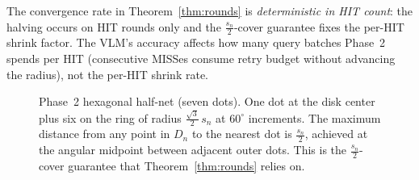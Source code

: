 \documentclass[sigconf,nonacm]{acmart}
\begin{document}
\medskip
\noindent
The convergence rate in Theorem~\ref{thm:rounds} is \emph{deterministic
in HIT count}: the halving occurs on HIT rounds only and the
$\frac{s_n}{2}$-cover guarantee fixes the per-HIT shrink factor.  The
VLM's accuracy affects how many query batches Phase~2 spends per HIT
(consecutive MISSes consume retry budget without advancing the
radius), not the per-HIT shrink rate.

\begin{figure}[t]
  \centering
  \caption{Phase~2 hexagonal half-net (seven dots).  One dot at the
    disk center plus six on the ring of radius
    $\frac{\sqrt{3}}{2}\,s_n$ at $60^\circ$ increments.  The maximum
    distance from any point in $D_n$ to the nearest dot is
    $\frac{s_n}{2}$, achieved at the angular midpoint between adjacent
    outer dots.  This is the $\frac{s_n}{2}$-cover guarantee that
    Theorem~\ref{thm:rounds} relies on.}
  \label{fig:hex-stencil}
\end{figure}
\end{document}

